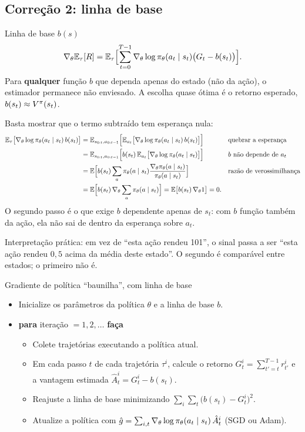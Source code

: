 \documentclass[11pt]{article}
\newcommand{\thv}{\theta}
\newcommand{\polth}{\pol_{\thv}}
\newcommand{\gth}{\nabla_{\thv}}
\newcommand{\traj}{\tau}
\newcommand{\Ahat}{\hat{A}}
\begin{document}
\subsection{Correção 2: linha de base}

\begin{defbox}{Linha de base $b(s)$}
\[
  \gth\E_{\traj}[R] = \E_{\traj}\Bigl[\sum_{t=0}^{T-1}
    \gth\log\polth(a_t\mid s_t)\bigl(G_t - b(s_t)\bigr)\Bigr].
\]
Para \textbf{qualquer} função $b$ que dependa apenas do estado (não da ação), o
estimador permanece não enviesado. A escolha quase ótima é o retorno esperado,
$b(s_t)\approx V^{\pi}(s_t)$.
\end{defbox}

\begin{provabox}
Basta mostrar que o termo subtraído tem esperança nula:
\begin{align*}
  \E_{\traj}\bigl[\gth\log\polth(a_t\mid s_t)\,b(s_t)\bigr]
   &= \E_{s_{0:t},a_{0:t-1}}\Bigl[\E_{a_t}\bigl[\gth\log\polth(a_t\mid s_t)\,b(s_t)\bigr]\Bigr]
     && \text{quebrar a esperança}\\
   &= \E_{s_{0:t},a_{0:t-1}}\Bigl[b(s_t)\,\E_{a_t}\bigl[\gth\log\polth(a_t\mid s_t)\bigr]\Bigr]
     && \text{$b$ não depende de $a_t$}\\
   &= \E\Bigl[b(s_t)\sum_a \polth(a\mid s_t)\frac{\gth\polth(a\mid s_t)}{\polth(a\mid s_t)}\Bigr]
     && \text{razão de verossimilhança}\\
   &= \E\Bigl[b(s_t)\,\gth\sum_a \polth(a\mid s_t)\Bigr]
    = \E\bigl[b(s_t)\,\gth 1\bigr] = 0 .
\end{align*}
O segundo passo é o que exige $b$ dependente apenas de $s_t$: com $b$ função
também da ação, ela não sai de dentro da esperança sobre $a_t$.
\end{provabox}

Interpretação prática: em vez de ``esta ação rendeu 101'', o sinal passa a ser
``esta ação rendeu $0{,}5$ acima da média deste estado''. O segundo é comparável
entre estados; o primeiro não é.

\begin{algbox}{Gradiente de política ``baunilha'', com linha de base}
\begin{itemize}[itemsep=0.1em]
  \item Inicialize os parâmetros da política $\thv$ e a linha de base $b$.
  \item \textbf{para} iteração $=1,2,\dots$ \textbf{faça}
    \begin{itemize}[itemsep=0.05em]
      \item Colete trajetórias executando a política atual.
      \item Em cada passo $t$ de cada trajetória $\traj^i$, calcule o retorno
        $G^i_t = \sum_{t'=t}^{T-1} r^i_{t'}$ e a vantagem estimada
        $\Ahat^i_t = G^i_t - b(s_t)$.
      \item Reajuste a linha de base minimizando $\sum_i\sum_t \bigl(b(s_t)-G^i_t\bigr)^2$.
      \item Atualize a política com
        $\hat g = \sum_{i,t}\gth\log\polth(a_t\mid s_t)\,\Ahat^i_t$
        (SGD ou Adam).
    \end{itemize}
\end{itemize}
\end{algbox}
\end{document}
